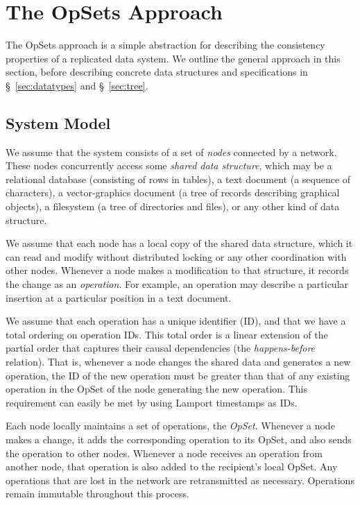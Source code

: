 \section{The OpSets Approach}\label{sec:approach}

The OpSets approach is a simple abstraction for describing the consistency properties of a replicated data system.
We outline the general approach in this section, before describing concrete data structures and specifications in \S~\ref{sec:datatypes} and \S~\ref{sec:tree}.

\subsection{System Model}\label{sec:system-model}

We assume that the system consists of a set of \emph{nodes} connected by a network.
These nodes concurrently access some \emph{shared data structure}, which may be a relational database (consisting of rows in tables), a text document (a sequence of characters), a vector-graphics document (a tree of records describing graphical objects), a filesystem (a tree of directories and files), or any other kind of data structure.

We assume that each node has a local copy of the shared data structure, which it can read and modify without distributed locking or any other coordination with other nodes.
Whenever a node makes a modification to that structure, it records the change as an \emph{operation}.
For example, an operation may describe a particular insertion at a particular position in a text document.

We assume that each operation has a unique identifier (ID), and that we have a total ordering on operation IDs.
This total order is a linear extension of the partial order that captures their causal dependencies (the \emph{happens-before} relation).
That is, whenever a node changes the shared data and generates a new operation, the ID of the new operation must be greater than that of any existing operation in the OpSet of the node generating the new operation.
This requirement can easily be met by using Lamport timestamps \cite{Lamport:1978jq} as IDs.

Each node locally maintains a set of operations, the \emph{OpSet}.
Whenever a node makes a change, it adds the corresponding operation to its OpSet, and also sends the operation to other nodes.
Whenever a node receives an operation from another node, that operation is also added to the recipient's local OpSet.
Any operations that are lost in the network are retransmitted as necessary.
Operations remain immutable throughout this process.

